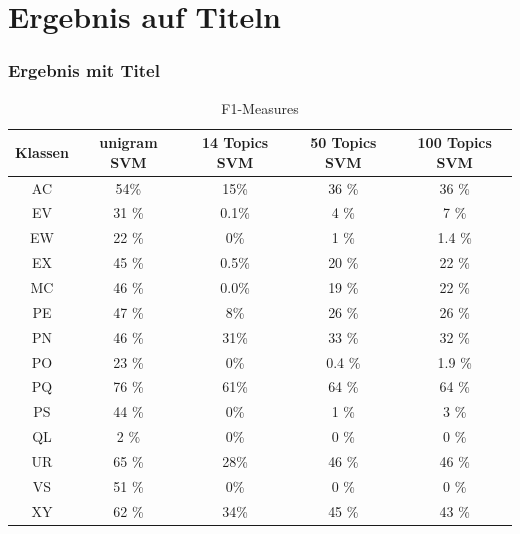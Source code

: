 \documentclass[12pt, xcolor=table]{beamer}
\begin{document}
\section{Ergebnis auf Titeln} %
\label{sec:Ergebnis}

\begin{frame}
    \frametitle{Ergebnis mit Titel}
    \begin{center}
    \begin{table}
    \begin{tabular}{c|cccc}
        \tiny\textbf{Klassen} &\tiny \textbf{unigram SVM} &\tiny \textbf{14 Topics SVM} & \tiny \textbf{50 Topics SVM} & \tiny \textbf{100 Topics SVM}\\
        \hline
        \tiny AC &\tiny 54\% &\tiny 15\% &\tiny 36 \% &\tiny 36 \%\\
        \tiny EV &\tiny 31 \% &\tiny 0.1\% &\tiny 4 \% &\tiny 7 \%\\
        \tiny EW &\tiny 22 \% &\tiny 0\% &\tiny 1 \% &\tiny 1.4 \%\\
        \tiny EX &\tiny 45 \% &\tiny 0.5\% &\tiny 20 \% &\tiny 22 \%\\
        \tiny MC &\tiny 46 \% &\tiny 0.0\% &\tiny 19 \% &\tiny 22 \%\\
        \tiny PE &\tiny 47 \% &\tiny 8\% &\tiny 26 \% &\tiny 26 \%\\
        \tiny PN &\tiny 46 \% &\tiny 31\% &\tiny 33 \% &\tiny 32 \%\\
        \tiny PO &\tiny 23 \% &\tiny 0\% &\tiny 0.4 \% &\tiny 1.9 \%\\
        \tiny PQ &\tiny 76 \% &\tiny 61\% &\tiny 64 \% &\tiny 64 \%\\
        \tiny PS &\tiny 44 \% &\tiny 0\% &\tiny 1 \% &\tiny 3 \%\\
        \tiny QL &\tiny 2 \% &\tiny 0\% &\tiny 0 \% &\tiny 0 \%\\
        \tiny UR &\tiny 65 \% &\tiny 28\% &\tiny 46 \% &\tiny 46 \%\\
        \tiny VS &\tiny 51 \% &\tiny 0\% &\tiny 0 \% &\tiny 0 \%\\
        \tiny XY &\tiny 62 \% &\tiny 34\% &\tiny 45 \% &\tiny 43 \%\\
    \end{tabular}
     \caption*{F1-Measures}
    \end{table}
    \end{center}
\end{frame}
\end{document}
